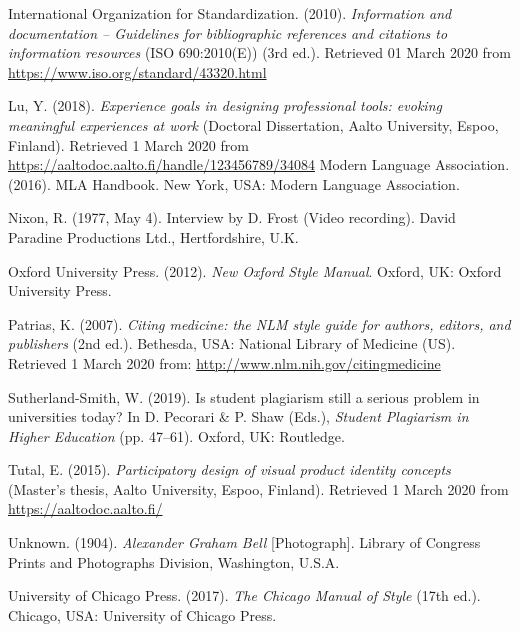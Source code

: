 \documentclass[finnish, 12pt, a4paper, arts, utf8, a-2b, online]{aaltothesis}
\begin{document}
\vspace{1ex}
\noindent
International Organization for Standardization. (2010). 
\textit{Information and documentation -- Guidelines for bibliographic references
	and citations to information resources} 
(ISO 690:2010(E)) (3rd ed.). Retrieved 01 March 2020 from 
\url{https://www.iso.org/standard/43320.html}

\vspace{1ex}
\noindent
Lu, Y. (2018). 
\textit{Experience goals in designing professional tools: evoking meaningful 
	experiences at work} 
(Doctoral Dissertation, Aalto University, Espoo, Finland). 
Retrieved 1 March 2020 from 
\url{https://aaltodoc.aalto.fi/handle/123456789/34084} 
Modern Language Association. (2016). MLA Handbook. New York, USA: Modern 
Language Association.

\vspace{1ex}
\noindent
Nixon, R. (1977, May 4). Interview by D. Frost (Video recording). 
David Paradine Productions Ltd., Hertfordshire, U.K.

\vspace{1ex}
\noindent
Oxford University Press. (2012). 
\textit{New Oxford Style Manual}. Oxford, UK: Oxford University Press.

\vspace{1ex}
\noindent
Patrias, K. (2007). 
\textit{Citing medicine: the NLM style guide for authors, editors, and 
	publishers} 
(2nd ed.). Bethesda, USA: National Library of Medicine (US). 
Retrieved 1 March 2020 from: \url{http://www.nlm.nih.gov/citingmedicine}

\vspace{1ex}
\noindent
Sutherland-Smith, W. (2019). Is student plagiarism still a serious problem in 
universities today? In D. Pecorari \& P. Shaw (Eds.), 
\textit{Student Plagiarism in Higher Education} (pp. 47--61). 
Oxford, UK: Routledge.

\vspace{1ex}
\noindent
Tutal, E. (2015). 
\textit{Participatory design of visual product identity concepts} 
(Master’s thesis, Aalto University, Espoo, Finland). 
Retrieved 1 March 2020 from \url{https://aaltodoc.aalto.fi/}

\vspace{1ex}
\noindent
Unknown. (1904). \textit{Alexander Graham Bell} [Photograph]. 
Library of Congress Prints and Photographs Division, Washington, U.S.A.

\vspace{1ex}
\noindent
University of Chicago Press. (2017). \textit{The Chicago Manual of Style} 
(17th ed.). Chicago, USA: University of Chicago Press.
\end{document}
